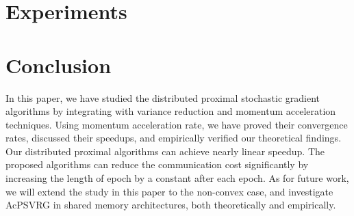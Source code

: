 \section{Experiments}
%


\section{Conclusion}
In this paper, we have studied the distributed proximal stochastic gradient algorithms by integrating with variance reduction and momentum acceleration techniques. Using momentum acceleration rate, we have proved their convergence rates, discussed their speedups, and empirically verified our theoretical findings. Our distributed proximal algorithms can achieve nearly linear speedup. The proposed algorithms can reduce the communication cost significantly by increasing the length of epoch by a constant after each epoch. As for future work, we will extend the study in this paper to the non-convex case, and investigate AcPSVRG in shared memory architectures, both theoretically and empirically.